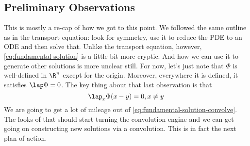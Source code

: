 \documentclass{bkcnotes}
\begin{document}
\subsection{Preliminary Observations}
This is mostly a re-cap of how we got to this point. We followed the
same outline as in the transport equation: look for symmetry, use it
to reduce the PDE to an ODE and then solve that. Unlike the transport
equation, however, \eqref{eq:fundamental-solution} is a little bit
more cryptic. And how we can use it to generate other solutions is
more unclear still. For now, let's just note that $\Phi$ is
well-defined in $\R^n$ except for the origin. Moreover, everywhere it
is defined, it satisfies $\lap \Phi = 0$. The key thing about that
last observation is that
\begin{equation}
  \label{eq:fundamental-solution-convolve}
  \lap_x\Phi(x-y) = 0, x\neq y
\end{equation}
We are going to get a lot of mileage out of
\eqref{eq:fundamental-solution-convolve}. The looks of that should
start turning the convolution engine and we can get going on
constructing new solutions via a convolution. This is in fact the next
plan of action.
\end{document}
